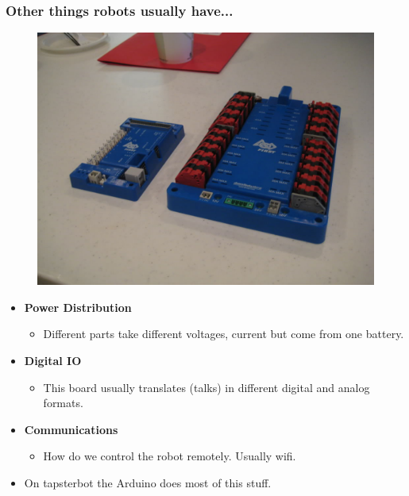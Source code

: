 \documentclass[compress]{beamer}
\begin{document}
\begin{frame}
  \frametitle{Other things robots usually have...}
   \begin{figure}
     \includegraphics[width=0.4\linewidth]{frc.jpg}
   \end{figure}

   \begin{itemize}
   \item \textbf{Power Distribution}
     \begin{itemize}
       \item Different parts take different voltages, current but come from one battery.
     \end{itemize}
   \item \textbf{Digital IO}
     \begin{itemize}
       \item This board usually translates (talks) in different digital and analog formats.
     \end{itemize}     
   \item \textbf{Communications} 
     \begin{itemize}
       \item How do we control the robot remotely. Usually wifi.
     \end{itemize}
     \item On tapsterbot the Arduino does most of this stuff. 
   \end{itemize}     
 \end{frame}
\end{document}
